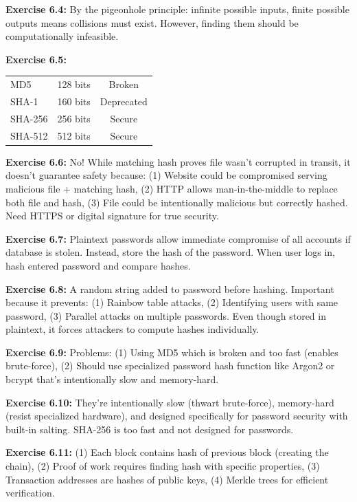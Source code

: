 \documentclass[11pt,a4paper]{report}
\begin{document}
\textbf{Exercise 6.4:}
By the pigeonhole principle: infinite possible inputs, finite possible outputs means collisions must exist. However, finding them should be computationally infeasible.

\textbf{Exercise 6.5:}
\begin{center}
\begin{tabular}{|l|c|c|}
\hline
MD5 & 128 bits & Broken \\
SHA-1 & 160 bits & Deprecated \\
SHA-256 & 256 bits & Secure \\
SHA-512 & 512 bits & Secure \\
\hline
\end{tabular}
\end{center}

\textbf{Exercise 6.6:}
No! While matching hash proves file wasn't corrupted in transit, it doesn't guarantee safety because: (1) Website could be compromised serving malicious file + matching hash, (2) HTTP allows man-in-the-middle to replace both file and hash, (3) File could be intentionally malicious but correctly hashed. Need HTTPS or digital signature for true security.

\textbf{Exercise 6.7:}
Plaintext passwords allow immediate compromise of all accounts if database is stolen. Instead, store the hash of the password. When user logs in, hash entered password and compare hashes.

\textbf{Exercise 6.8:}
A random string added to password before hashing. Important because it prevents: (1) Rainbow table attacks, (2) Identifying users with same password, (3) Parallel attacks on multiple passwords. Even though stored in plaintext, it forces attackers to compute hashes individually.

\textbf{Exercise 6.9:}
Problems: (1) Using MD5 which is broken and too fast (enables brute-force), (2) Should use specialized password hash function like Argon2 or bcrypt that's intentionally slow and memory-hard.

\textbf{Exercise 6.10:}
They're intentionally slow (thwart brute-force), memory-hard (resist specialized hardware), and designed specifically for password security with built-in salting. SHA-256 is too fast and not designed for passwords.

\textbf{Exercise 6.11:}
(1) Each block contains hash of previous block (creating the chain), (2) Proof of work requires finding hash with specific properties, (3) Transaction addresses are hashes of public keys, (4) Merkle trees for efficient verification.
\end{document}
